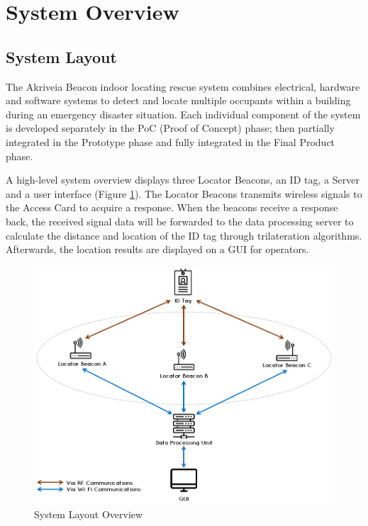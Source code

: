

\setcounter{section}{1}
\section{System Overview}
\bigskip
\subsection{System Layout}
The Akriveia Beacon indoor locating rescue system combines electrical, hardware and software systems to detect and locate multiple occupants within a building during an emergency disaster situation. Each individual component of the system is developed separately in the PoC (Proof of Concept) phase; then partially integrated in the Prototype phase and fully integrated in the Final Product phase.

\bigskip
A high-level system overview displays three Locator Beacons, an ID tag, a Server and a user interface (Figure \ref{fig:system_layout}).
The Locator Beacons transmits wireless signals to the Access Card to acquire a response.
When the beacons receive a response back, the received signal data will be forwarded to the data processing server to calculate the distance and location of the ID tag through trilateration algorithms.
Afterwards, the location results are displayed on a \Gls{GUI} for operators.

\begin{figure}[h!]
    \centering
    \includegraphics[width=\linewidth]{./images/00_sys_arch.png}
    \caption{System Layout Overview}
    \label{fig:system_layout}
\end{figure}


